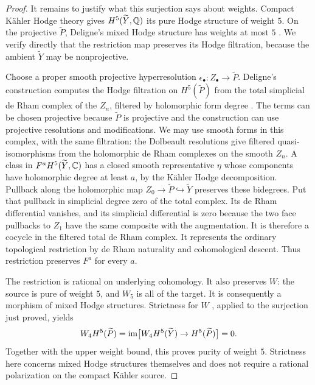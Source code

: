 \begin{proof}
It remains to justify what this surjection says about weights.
Compact K\"ahler Hodge theory gives $H^5(\widetilde Y,\mathbb{Q})$ its pure
Hodge structure of weight $5$.  On the projective $\widetilde P$,
Deligne's mixed Hodge structure has weights at most $5$
\cite[Theorem~8.2.4(iii)]{DeligneHodgeIII}.  We verify directly that
the restriction map preserves its Hodge filtration, because the
ambient $\widetilde Y$ may be nonprojective.

Choose a proper smooth projective hyperresolution
$\epsilon_\bullet\colon Z_\bullet\to\widetilde P$.  Deligne's
construction computes the Hodge filtration on $H^5(\widetilde P)$
from the total simplicial de Rham complex of the $Z_n$, filtered by
holomorphic form degree
\cite[Section~8.1, (8.2.1), and Proposition~8.2.2]{DeligneHodgeIII}.
The terms can be chosen projective because $\widetilde P$ is projective
and the construction can use projective resolutions and modifications.
We may use smooth forms in this complex, with the same filtration:
the Dolbeault resolutions give filtered quasi-isomorphisms from the
holomorphic de Rham complexes on the smooth $Z_n$.
A class in $F^aH^5(\widetilde Y,\mathbb{C})$ has a closed smooth representative
$\eta$ whose components have holomorphic degree at least $a$, by the
K\"ahler Hodge decomposition.  Pullback along the holomorphic map
$Z_0\to\widetilde P\hookrightarrow\widetilde Y$ preserves these
bidegrees.  Put that pullback in simplicial degree zero of the total
complex.  Its de Rham differential vanishes, and its simplicial
differential is zero because the two face pullbacks to $Z_1$ have the
same composite with the augmentation.  It is therefore a cocycle in
the filtered total de Rham complex.  It represents the ordinary
topological restriction by de Rham
naturality and cohomological descent.  Thus restriction preserves
$F^a$ for every $a$.

The restriction is rational on underlying cohomology.  It also
preserves $W$: the source is pure of weight $5$, and $W_5$ is all of
the target.  It is consequently a morphism of mixed Hodge structures.
Strictness for $W$ \cite[Theorem~2.3.5(iii)]{DeligneHodgeII}, applied
to the surjection just proved, yields
\[
 W_4H^5(\widetilde P)
     =\operatorname{im}\bigl[W_4H^5(\widetilde Y)\to H^5(\widetilde P)\bigr]=0.
\]
Together with the upper weight bound, this proves purity of weight
$5$.  Strictness here concerns mixed Hodge structures themselves and
does not require a rational polarization on the compact K\"ahler
source.
\end{proof}

